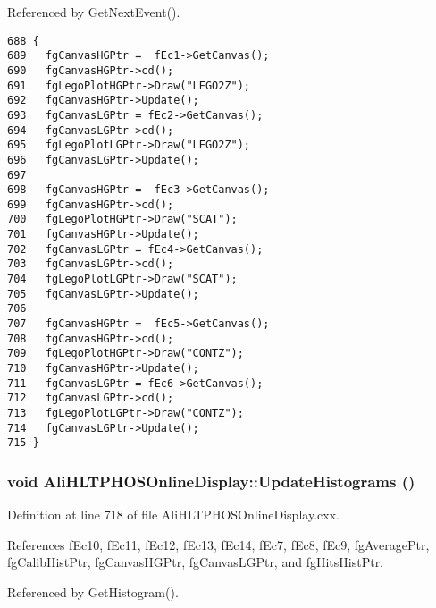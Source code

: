 Referenced by Get\-Next\-Event().

\footnotesize\begin{verbatim}688 {
689   fgCanvasHGPtr =  fEc1->GetCanvas();
690   fgCanvasHGPtr->cd();
691   fgLegoPlotHGPtr->Draw("LEGO2Z");
692   fgCanvasHGPtr->Update();
693   fgCanvasLGPtr = fEc2->GetCanvas();
694   fgCanvasLGPtr->cd();
695   fgLegoPlotLGPtr->Draw("LEGO2Z");
696   fgCanvasLGPtr->Update();
697 
698   fgCanvasHGPtr =  fEc3->GetCanvas();
699   fgCanvasHGPtr->cd();
700   fgLegoPlotHGPtr->Draw("SCAT");
701   fgCanvasHGPtr->Update();
702   fgCanvasLGPtr = fEc4->GetCanvas();
703   fgCanvasLGPtr->cd();
704   fgLegoPlotLGPtr->Draw("SCAT");
705   fgCanvasLGPtr->Update();
706 
707   fgCanvasHGPtr =  fEc5->GetCanvas();
708   fgCanvasHGPtr->cd();
709   fgLegoPlotHGPtr->Draw("CONTZ");
710   fgCanvasHGPtr->Update();
711   fgCanvasLGPtr = fEc6->GetCanvas();
712   fgCanvasLGPtr->cd();
713   fgLegoPlotLGPtr->Draw("CONTZ");
714   fgCanvasLGPtr->Update();
715 }
\end{verbatim}\normalsize 


\subsubsection{\setlength{\rightskip}{0pt plus 5cm}void Ali\-HLTPHOSOnline\-Display::Update\-Histograms ()}\label{classAliHLTPHOSOnlineDisplay_a6}




Definition at line 718 of file Ali\-HLTPHOSOnline\-Display.cxx.

References f\-Ec10, f\-Ec11, f\-Ec12, f\-Ec13, f\-Ec14, f\-Ec7, f\-Ec8, f\-Ec9, fg\-Average\-Ptr, fg\-Calib\-Hist\-Ptr, fg\-Canvas\-HGPtr, fg\-Canvas\-LGPtr, and fg\-Hits\-Hist\-Ptr.

Referenced by Get\-Histogram().

